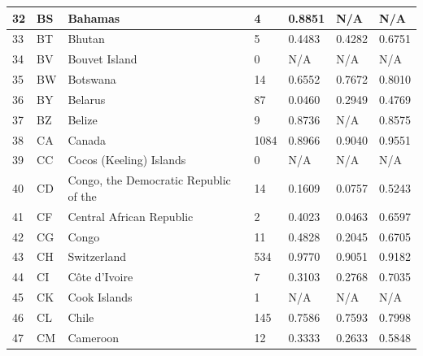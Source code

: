 \documentclass{article}
\begin{document}
\begin{table}
\begin{longtable}{|l|l|l|l|l|l|l|}
32  & BS           & Bahamas                                              & 4     & 0.8851 & N/A    & N/A    \\ \hline
33  & BT           & Bhutan                                               & 5     & 0.4483 & 0.4282 & 0.6751 \\ \hline
34  & BV           & Bouvet Island                                        & 0     & N/A    & N/A    & N/A    \\ \hline
35  & BW           & Botswana                                             & 14    & 0.6552 & 0.7672 & 0.8010 \\ \hline
36  & BY           & Belarus                                              & 87    & 0.0460 & 0.2949 & 0.4769 \\ \hline
37  & BZ           & Belize                                               & 9     & 0.8736 & N/A    & 0.8575 \\ \hline
38  & CA           & Canada                                               & 1084  & 0.8966 & 0.9040 & 0.9551 \\ \hline
39  & CC           & Cocos (Keeling) Islands                              & 0     & N/A    & N/A    & N/A    \\ \hline
40  & CD           & Congo, the Democratic Republic of the                & 14    & 0.1609 & 0.0757 & 0.5243 \\ \hline
41  & CF           & Central African Republic                             & 2     & 0.4023 & 0.0463 & 0.6597 \\ \hline
42  & CG           & Congo                                                & 11    & 0.4828 & 0.2045 & 0.6705 \\ \hline
43  & CH           & Switzerland                                          & 534   & 0.9770 & 0.9051 & 0.9182 \\ \hline
44  & CI           & Côte d'Ivoire                                        & 7     & 0.3103 & 0.2768 & 0.7035 \\ \hline
45  & CK           & Cook Islands                                         & 1     & N/A    & N/A    & N/A    \\ \hline
46  & CL           & Chile                                                & 145   & 0.7586 & 0.7593 & 0.7998 \\ \hline
47  & CM           & Cameroon                                             & 12    & 0.3333 & 0.2633 & 0.5848 \\ \hline
\end{longtable}
\end{table}


 
\end{document}
